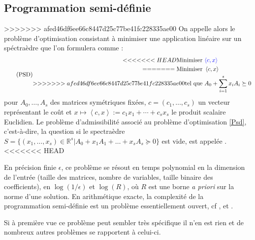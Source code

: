 \subsection{Programmation semi-définie}
\label{subsec:psdreele} 
>>>>>>> afed46df6ee66c8447d25c77be41fc228335ae00
On appelle alors  le problème d'optimisation
consistant à minimiser une application linéaire sur un spéctraèdre que l'on formulera comme :
\begin{equation}
  \tag{PSD}
\begin{aligned}
<<<<<<< HEAD
  \text{Minimiser } & {\color{blue} \left\langle c,x \right\rangle} \\
=======
  \text{Minimiser } & \left\langle c,x \right\rangle \\
>>>>>>> afed46df6ee66c8447d25c77be41fc228335ae00
  \text{tel que }   & A_0 + \sum \limits_{i=1}^s x_{i}A_{i} \succeq 0
\end{aligned}
	\label{Psd} 
\end{equation}
pour $A_0,\ldots, A_s$ des matrices symétriques fixées, $c=(c_1,\ldots,c_s)$ un vecteur représentant le coût et $x \mapsto \left\langle c,x \right\rangle := c_1x_1+\cdots+c_sx_s$ le produit scalaire Euclidien. Le problème d'admissibilité associé au problème d'optimisation \eqref{Psd}, c'est-à-dire, la question si le spectraèdre $S = \{(x_1,\ldots,x_s) \in \mathbb{R}^s | A_0+ x_1A_1 + \ldots+ x_s A_s \succeq 0 \}$ est vide, est appelée .
<<<<<<< HEAD

En précision finie $\epsilon$, ce problème se résout en temps polynomial en la dimension de l'entrée (taille des matrices, nombre de variables, taille binaire des coefficients), en $\log(1/\epsilon)$ et $\log(R)$, où $R$ est une borne {\it a priori} sur la norme d'une solution. En arithmétique exacte, la complexité de la programmation semi-définie est un problème essentiellement ouvert, cf \cite[Sec.1.9]{deKlerk}, \cite{ramana1997exact,porkolab1997complexity} et \cite{henrion2016exact}.

Si à première vue ce problème peut sembler très spécifique il n'en est rien et de nombreux autres problèmes se rapportent à celui-ci. 



